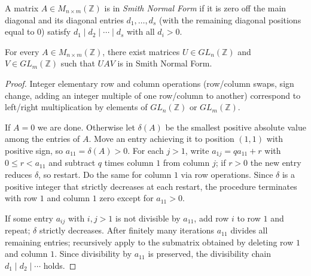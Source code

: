 \begin{definition}
    \label{def:snf}
    A matrix $A \in M_{n \times m}(\mathbb{Z})$ is in \emph{Smith Normal Form} if
    it is zero off the main diagonal and its diagonal entries
    $d_1, \dots, d_s$ (with the remaining diagonal positions equal to $0$)
    satisfy $d_1 \mid d_2 \mid \cdots \mid d_s$ with all $d_i > 0$.
\end{definition}

\begin{lemma}
    \label{lem:snf-existence}
    For every $A \in M_{n \times m}(\mathbb{Z})$, there exist matrices
    $U \in GL_n(\mathbb{Z})$ and $V \in GL_m(\mathbb{Z})$ such that $U A V$ is in Smith Normal Form.
\end{lemma}
\begin{proof}
    Integer elementary row and column operations (row/column swaps, sign
    change, adding an integer multiple of one row/column to another) correspond
    to left/right multiplication by elements of $GL_n(\mathbb{Z})$ or $GL_m(\mathbb{Z})$.

    If $A = 0$ we are done. Otherwise let $\delta(A)$ be the smallest positive
    absolute value among the entries of $A$. Move an entry achieving it to
    position $(1,1)$ with positive sign, so $a_{11} = \delta(A) > 0$. For each
    $j > 1$, write $a_{1j} = q a_{11} + r$ with $0 \le r < a_{11}$ and subtract
    $q$ times column $1$ from column $j$; if $r > 0$ the new entry reduces
    $\delta$, so restart. Do the same for column $1$ via row operations.
    Since $\delta$ is a positive integer that strictly decreases at each
    restart, the procedure terminates with row $1$ and column $1$ zero except
    for $a_{11} > 0$.

    If some entry $a_{ij}$ with $i, j > 1$ is not divisible by $a_{11}$, add
    row $i$ to row $1$ and repeat; $\delta$ strictly decreases. After finitely
    many iterations $a_{11}$ divides all remaining entries; recursively apply
    to the submatrix obtained by deleting row $1$ and column $1$. Since
    divisibility by $a_{11}$ is preserved, the divisibility chain
    $d_1 \mid d_2 \mid \cdots$ holds.
\end{proof}

